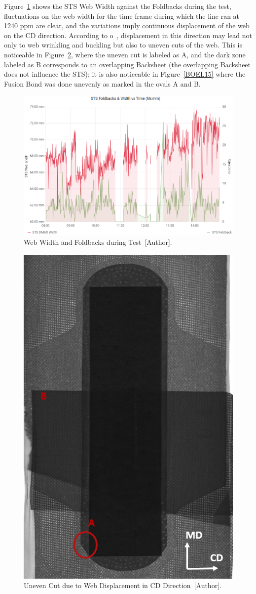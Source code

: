 Figure~\ref{widthL15} shows the STS Web Width against the Foldbacks during the test, fluctuations on the web width for the time frame during which the line ran at 1240 ppm are clear, and the variations imply continuous displacement of the web on the CD direction. According to o~\cite{walker2009taxonomy}, displacement in this direction may lead not only to web wrinkling and buckling but also to uneven cuts of the web. This is noticeable in Figure~\ref{cutL15}, where the uneven cut is labeled as A, and the dark zone labeled as B corresponds to an overlapping Backsheet (the overlapping Backsheet does not influence the STS); it is also noticeable in Figure~\ref{BOEL15} where the Fusion Bond was done unevenly as marked in the ovals A and B.

\begin{figure}[H]
    \centering
    \includegraphics[width=1\linewidth, height=0.4\textheight]{FIGURES/widthL15.png}
    \caption{Web Width and Foldbacks during Test~[Author].}
    \label{widthL15}
\end{figure}

\begin{figure}[H]
    \centering
    \includegraphics[width=0.5\linewidth]{FIGURES/CutL15.png}
    \caption{Uneven Cut due to Web Displacement in CD Direction~[Author].}
    \label{cutL15}
\end{figure}

